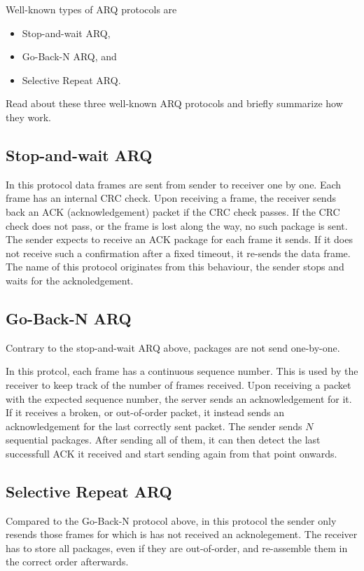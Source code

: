 \documentclass[a4paper,10pt]{article}
\begin{document}
Well-known types of ARQ protocols are
\begin{itemize}
  \item Stop-and-wait ARQ,
  \item Go-Back-N ARQ, and
  \item Selective Repeat ARQ.
\end{itemize}
Read about these three well-known ARQ protocols and briefly summarize how they work.

\subsection{Stop-and-wait ARQ}
In this protocol data frames are sent from sender to receiver one by one. Each frame has an internal CRC check. Upon receiving a frame, the receiver sends back an ACK (acknowledgement) packet if the CRC check passes. If the CRC check does not pass, or the frame is lost along the way, no such package is sent.
The sender expects to receive an ACK package for each frame it sends. If it does not receive such a confirmation after a fixed timeout, it re-sends the data frame. The name of this protocol originates from this behaviour, the sender stops and waits for the acknoledgement.

\subsection{Go-Back-N ARQ}
Contrary to the stop-and-wait ARQ above, packages are not send one-by-one.

In this protcol, each frame has a continuous sequence number. This is used by the receiver to keep track of the number of frames received. Upon receiving a packet with the expected sequence number, the server sends an acknowledgement for it. If it receives a broken, or out-of-order packet, it instead sends an acknowledgement for the last correctly sent packet.
The sender sends $N$ sequential packages. After sending all of them, it can then detect the last successfull ACK it received and start sending again from that point onwards.

\subsection{Selective Repeat ARQ}
Compared to the Go-Back-N protocol above, in this protocol the sender only resends those frames for which is has not received an acknolegement. The receiver has to store all packages, even if they are out-of-order, and re-assemble them in the correct order afterwards.
\end{document}
